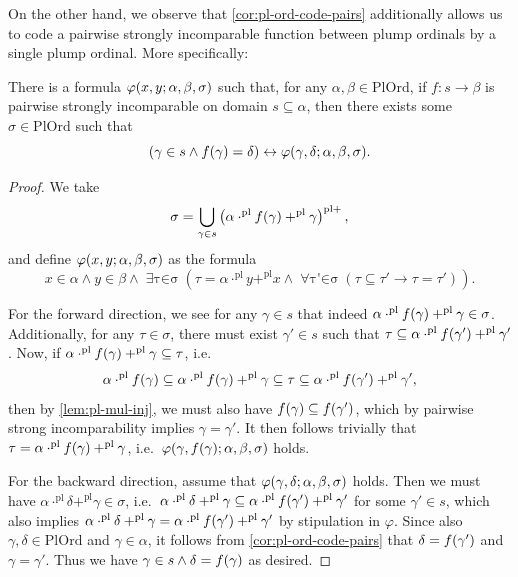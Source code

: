 \documentclass[12pt,openany]{book}
\theoremstyle{plain}
\theoremstyle{definition}
\newcommand\opA[1]{\mathop{\forall #1}}
\newcommand\opE[1]{\mathop{\exists #1}}
\newcommand\PlOrd{\mathrm{PlOrd}}
\newcommand\pl{\mathrm{pl}}
\newcommand\pls{{\pl +}}
\begin{document}
On the other hand, we observe that \autoref{cor:pl-ord-code-pairs} additionally allows us to code a pairwise strongly incomparable function between plump ordinals by a single plump ordinal. More specifically:
\begin{proposition}
  \label{prop:pl-str-incom-func-as-pl-ord}
  There is a formula $\varphi\mleft(x, y; \alpha, \beta, \sigma\mright)$ such that, for any $\alpha, \beta \in \PlOrd$, if $f : s \rightarrow \beta$ is pairwise strongly incomparable on domain $s \subseteq \alpha$, then there exists some $\sigma \in \PlOrd$ such that
  \[\left(\gamma \in s \land f\mleft(\gamma\mright) = \delta\right) \leftrightarrow \varphi\mleft(\gamma, \delta; \alpha, \beta, \sigma\mright).\]
\end{proposition}

\begin{proof}
  We take
  \[\sigma = \bigcup_{\gamma \in s} \left(\alpha \cdot^\pl f\mleft(\gamma\mright) +^\pl \gamma\right)^\pls,\]
  and define $\varphi\mleft(x, y; \alpha, \beta, \sigma\mright)$ as the formula
  \[x \in \alpha \land y \in \beta \land \opE{\tau \in \sigma} \left(\tau = \alpha \cdot^\pl y +^\pl x \land \opA{\tau' \in \sigma} \left(\tau \subseteq \tau' \rightarrow \tau = \tau'\right)\right).\]

  For the forward direction, we see for any $\gamma \in s$ that indeed $\alpha \cdot^\pl f\mleft(\gamma\mright) +^\pl \gamma \in \sigma$. Additionally, for any $\tau \in \sigma$, there must exist $\gamma' \in s$ such that $\tau \subseteq \alpha \cdot^\pl f\mleft(\gamma'\mright) +^\pl \gamma'$. Now, if $\alpha \cdot^\pl f\mleft(\gamma\mright) +^\pl \gamma \subseteq \tau$, i.e.
  \[\alpha \cdot^\pl f\mleft(\gamma\mright) \subseteq \alpha \cdot^\pl f\mleft(\gamma\mright) +^\pl \gamma \subseteq \tau \subseteq \alpha \cdot^\pl f\mleft(\gamma'\mright) +^\pl \gamma',\]
  then by \autoref{lem:pl-mul-inj}, we must also have $f\mleft(\gamma\mright) \subseteq f\mleft(\gamma'\mright)$, which by pairwise strong incomparability implies $\gamma = \gamma'$. It then follows trivially that $\tau = \alpha \cdot^\pl f\mleft(\gamma\mright) +^\pl \gamma$, i.e.\ $\varphi\mleft(\gamma, f\mleft(\gamma\mright); \alpha, \beta, \sigma\mright)$ holds.

  For the backward direction, assume that $\varphi\mleft(\gamma, \delta; \alpha, \beta, \sigma\mright)$ holds. Then we must have $\alpha \cdot^\pl \delta +^\pl \gamma \in \sigma$, i.e.\ $\alpha \cdot^\pl \delta +^\pl \gamma \subseteq \alpha \cdot^\pl f\mleft(\gamma'\mright) +^\pl \gamma'$ for some $\gamma' \in s$, which also implies $\alpha \cdot^\pl \delta +^\pl \gamma = \alpha \cdot^\pl f\mleft(\gamma'\mright) +^\pl \gamma'$ by stipulation in $\varphi$. Since also $\gamma, \delta \in \PlOrd$ and $\gamma \in \alpha$, it follows from \autoref{cor:pl-ord-code-pairs} that $\delta = f\mleft(\gamma'\mright)$ and $\gamma = \gamma'$. Thus we have $\gamma \in s \land \delta = f\mleft(\gamma\mright)$ as desired.
\end{proof}
\end{document}
